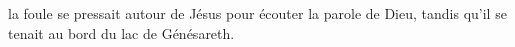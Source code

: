 \encetemps 
	la foule se pressait autour de Jésus pour écouter la parole de Dieu,
	tandis qu’il se tenait au bord du lac de Génésareth.
